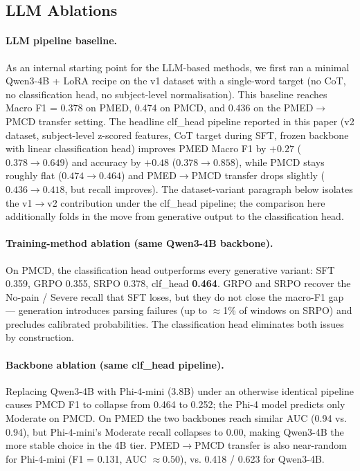 \documentclass{article}
\begin{document}
\subsection{LLM Ablations}

\paragraph{LLM pipeline baseline.} As an internal starting point for the LLM-based methods, we first ran a minimal Qwen3-4B + LoRA recipe on the v1 dataset with a single-word target (no CoT, no classification head, no subject-level normalisation). This baseline reaches Macro F1 = 0.378 on PMED, 0.474 on PMCD, and 0.436 on the PMED$\to$PMCD transfer setting. The headline clf\_head pipeline reported in this paper (v2 dataset, subject-level z-scored features, CoT target during SFT, frozen backbone with linear classification head) improves PMED Macro F1 by $+0.27$ ($0.378\!\to\!0.649$) and accuracy by $+0.48$ ($0.378\!\to\!0.858$), while PMCD stays roughly flat ($0.474\!\to\!0.464$) and PMED$\to$PMCD transfer drops slightly ($0.436\!\to\!0.418$, but recall improves). The dataset-variant paragraph below isolates the v1$\to$v2 contribution under the clf\_head pipeline; the comparison here additionally folds in the move from generative output to the classification head.

\paragraph{Training-method ablation (same Qwen3-4B backbone).} On PMCD, the classification head outperforms every generative variant: SFT 0.359, GRPO 0.355, SRPO 0.378, clf\_head \textbf{0.464}. GRPO and SRPO recover the No-pain / Severe recall that SFT loses, but they do not close the macro-F1 gap --- generation introduces parsing failures (up to $\approx$1\% of windows on SRPO) and precludes calibrated probabilities. The classification head eliminates both issues by construction.

\paragraph{Backbone ablation (same clf\_head pipeline).} Replacing Qwen3-4B with Phi-4-mini (3.8B) under an otherwise identical pipeline causes PMCD F1 to collapse from 0.464 to 0.252; the Phi-4 model predicts only Moderate on PMCD. On PMED the two backbones reach similar AUC (0.94 vs. 0.94), but Phi-4-mini's Moderate recall collapses to $0.00$, making Qwen3-4B the more stable choice in the 4B tier. PMED$\to$PMCD transfer is also near-random for Phi-4-mini (F1 = 0.131, AUC $\approx 0.50$), vs. 0.418 / 0.623 for Qwen3-4B.
\end{document}
